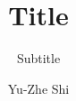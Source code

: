 \documentclass{beamer}
\title[About Beamer] %
{Title}
\subtitle{Subtitle}
\author[Yu-Zhe Shi] %
{Yu-Zhe Shi}
\begin{document}
\begin{frame}
    \frametitle{}
    
        

\end{frame}
\end{document}
